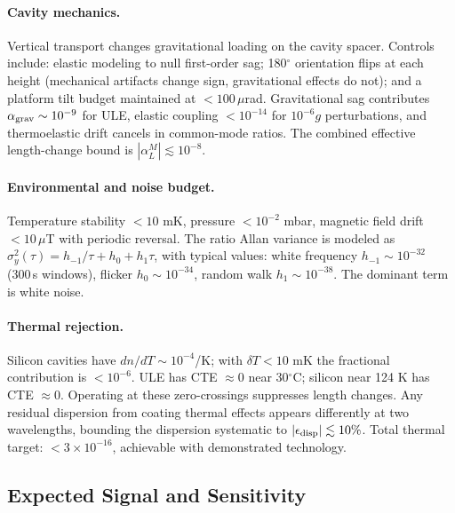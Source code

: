 \paragraph{Cavity mechanics.}
Vertical transport changes gravitational loading on the cavity spacer.  Controls include: elastic modeling to null first-order sag; 180$^\circ$ orientation flips at each height (mechanical artifacts change sign, gravitational effects do not); and a platform tilt budget maintained at ${<}100\,\mu$rad.  Gravitational sag contributes $\alpha_{\rm grav} \sim 10^{-9}$ for ULE, elastic coupling ${<}10^{-14}$ for $10^{-6}g$ perturbations, and thermoelastic drift cancels in common-mode ratios.  The combined effective length-change bound is $|\alpha_L^M| \lesssim 10^{-8}$.

\paragraph{Environmental and noise budget.}
Temperature stability ${<}10$ mK, pressure ${<}10^{-2}$ mbar, magnetic field drift ${<}10\,\mu$T with periodic reversal.  The ratio Allan variance is modeled as $\sigma_y^2(\tau) = h_{-1}/\tau + h_0 + h_1\tau$, with typical values: white frequency $h_{-1} \sim 10^{-32}$ (300\,s windows), flicker $h_0 \sim 10^{-34}$, random walk $h_1 \sim 10^{-38}$.  The dominant term is white noise.

\paragraph{Thermal rejection.}
Silicon cavities have $dn/dT \sim 10^{-4}$/K; with $\delta T < 10$ mK the fractional contribution is ${<}10^{-6}$.  ULE has CTE $\approx 0$ near 30$^\circ$C; silicon near 124 K has CTE $\approx 0$.  Operating at these zero-crossings suppresses length changes.  Any residual dispersion from coating thermal effects appears differently at two wavelengths, bounding the dispersion systematic to $|\epsilon_{\rm disp}| \lesssim 10\%$.  Total thermal target: ${<}3 \times 10^{-16}$, achievable with demonstrated technology.

\subsection{Expected Signal and Sensitivity}\label{sec:cavity-sensitivity}

